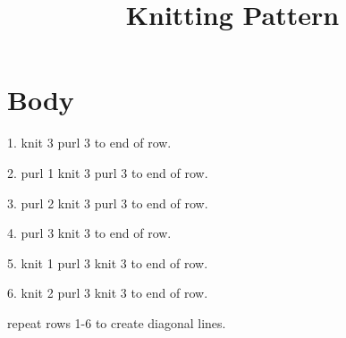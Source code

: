 \documentclass[10pt]{article}
\title{Knitting Pattern}
\date{}
\begin{document}
\maketitle

\section*{Body}

1. knit 3 purl 3 to end of row.

2. purl 1 knit 3 purl 3 to end of row.

3. purl 2 knit 3 purl 3 to end of row.

4. purl 3 knit 3 to end of row.

5. knit 1 purl 3 knit 3 to end of row.

6. knit 2 purl 3 knit 3 to end of row.

repeat rows 1-6 to create diagonal lines.
\end{document}
